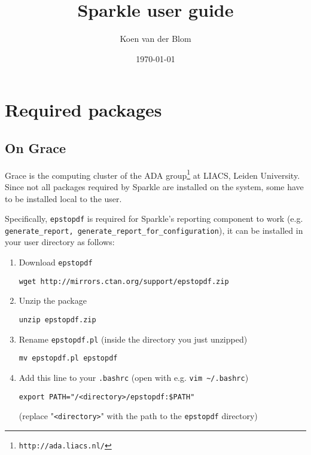 \documentclass{article}
\title{Sparkle user guide}
\author{Koen van der Blom}
\date{\today}
\begin{document}
\maketitle

\section{Required packages}

\subsection{On Grace}

Grace is the computing cluster of the ADA group\footnote{\texttt{http://ada.liacs.nl/}} at LIACS, Leiden University. Since not all packages required by Sparkle are installed on the system, some have to be installed local to the user.

Specifically, \texttt{epstopdf} is required for Sparkle's reporting component to work (e.g. \texttt{generate\_report, generate\_report\_for\_configuration}), it can be installed in your user directory as follows:

\begin{enumerate}
  \item Download \texttt{epstopdf}

  \texttt{wget http://mirrors.ctan.org/support/epstopdf.zip}

  \item Unzip the package

  \texttt{unzip epstopdf.zip}

  \item Rename \texttt{epstopdf.pl} (inside the directory you just unzipped)

  \texttt{mv epstopdf.pl epstopdf}

  \item Add this line to your \texttt{.bashrc} (open with e.g. \texttt{vim \~{}/.bashrc})

  \texttt{export PATH="/<directory>/epstopdf:\$PATH"}

  (replace "\texttt{<directory>}" with the path to the \texttt{epstopdf} directory)
\end{enumerate}
\end{document}
